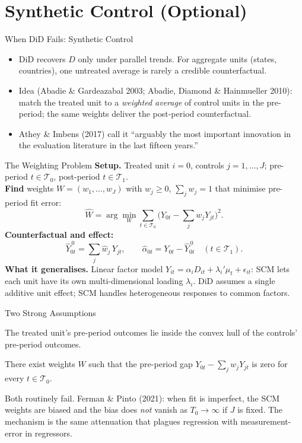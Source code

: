 \documentclass[aspectratio=169, handout]{beamer}
\numberwithin{equation}{section}
\begin{document}
\section{Synthetic Control (Optional)}
\setcounter{subsection}{1}

\begin{frame}{When DiD Fails: Synthetic Control}
\begin{itemize}
\item DiD recovers $D$ only under parallel trends. For aggregate units (states, countries), one untreated average is rarely a credible counterfactual.
\item Idea (Abadie \& Gardeazabal 2003; Abadie, Diamond \& Hainmueller 2010): match the treated unit to a \emph{weighted average} of control units in the pre-period; the same weights deliver the post-period counterfactual.
\item Athey \& Imbens (2017) call it ``arguably the most important innovation in the evaluation literature in the last fifteen years.''
\end{itemize}
\end{frame}

\begin{frame}{The Weighting Problem}
\textbf{Setup.} Treated unit $i=0$, controls $j=1,\dots,J$; pre-period $t\in\mathcal{T}_0$, post-period $t\in\mathcal{T}_1$.\\[4pt]
\textbf{Find} weights $W = (w_1,\dots,w_J)$ with $w_j\geq 0$, $\sum_j w_j = 1$ that minimise pre-period fit error:
$$\hat W = \arg\min_W \sum_{t\in\mathcal{T}_0}\!\Big(Y_{0t} - \sum_j w_j Y_{jt}\Big)^{\!2}.$$
\textbf{Counterfactual and effect:}
$$\hat Y_{0t}^{\,0} = \sum_j \hat w_j\, Y_{jt}, \qquad \hat\alpha_{0t} = Y_{0t} - \hat Y_{0t}^{\,0} \quad (t\in\mathcal{T}_1).$$
\pause
\textbf{What it generalises.} Linear factor model $Y_{it} = \alpha_i D_{it} + \lambda_i'\mu_t + \epsilon_{it}$: SCM lets each unit have its own multi-dimensional loading $\lambda_i$. DiD assumes a single additive unit effect; SCM handles heterogeneous responses to common factors.
\end{frame}

\begin{frame}{Two Strong Assumptions}
\begin{tcolorbox}[colback=blue!6, colframe=blue, title=Convex hull]
\centering
The treated unit's pre-period outcomes lie inside the convex hull of the controls' pre-period outcomes.
\end{tcolorbox}
\vspace{4pt}
\begin{tcolorbox}[colback=darkgreen!6, colframe=darkgreen, title=Perfect pre-period fit]
\centering
There exist weights $W$ such that the pre-period gap $Y_{0t} - \sum_j w_j Y_{jt}$ is zero for every $t\in\mathcal{T}_0$.
\end{tcolorbox}
\vspace{4pt}
Both routinely fail. Ferman \& Pinto (2021): when fit is imperfect, the SCM weights are biased and the bias does \emph{not} vanish as $T_0\to\infty$ if $J$ is fixed. The mechanism is the same attenuation that plagues regression with measurement-error in regressors.
\end{frame}
\end{document}
